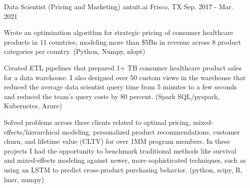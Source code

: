 \begin{cventries}
  \cventry
    {Data Scientist (Pricing and Marketing)} %
    {antuit.ai} %
    {Frisco, TX} %
    {Sep. 2017 - Mar. 2021} %
    {
      \begin{cvitems} %
      \item {
          Wrote an optimization algorithm for strategic pricing of consumer
          healthcare products in 11 countries, modeling more than \$5Bn in
          revenue across 8 product categories per country.
          (Python, Numpy, nlopt)
      }
      \item {
          Created ETL pipelines that prepared 1+ TB consumer healthcare
          product sales for a data warehouse.   I also designed over 50 custom
          views in the warehouse that reduced the average data scientist query
          time from 5 minutes to a few seconds and reduced the team's query
          costs by 80 percent. (Spark SQL/pyspark, Kubernetes, Azure)
      }
      \item {
          Solved problems across three clients
          related to optimal pricing, mixed-effects/hierarchical modeling,
          personalized product recommendations, customer
          churn, and lifetime value (CLTV) for over 1MM program members.  In
          these projects I had the opportunity to benchmark traditional methods
          like survival and mixed-effects modeling against newer, more
          sophisticated techniques, such as using an LSTM to predict
          cross-product purchasing behavior. (python, scipy, R, lmer, numpy)
      }
      \end{cvitems}
    }

\end{cventries}
